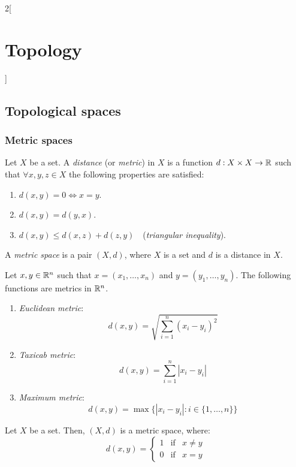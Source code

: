 \documentclass[../../../main.tex]{subfiles}
\begin{document}
\begin{multicols}{2}[\section{Topology}]
  \subsection{Topological spaces}
  \subsubsection{Metric spaces}
  \begin{definition}
    Let $X$ be a set. A \emph{distance} (or \emph{metric}) in $X$ is a function $d:X\times X\rightarrow\mathbb{R} $ such that $\forall x,y,z\in X$ the following properties are satisfied:
    \begin{enumerate}
      \item $d(x,y)=0\iff x=y$.
      \item $d(x,y)=d(y,x)$.
      \item $d(x,y)\leq d(x,z)+d(z,y)\quad$(\emph{triangular inequality}).
    \end{enumerate}
  \end{definition}
  \begin{definition}
    A \emph{metric space} is a pair $(X,d)$, where $X$ is a set and $d$ is a distance in $X$.
  \end{definition}
  \begin{proposition}
    Let $x,y\in\mathbb{R}^n$ such that $x=(x_1,\ldots,x_n)$ and $y=(y_1,\ldots,y_n)$. The following functions are metrics in $\mathbb{R}^n$.
    \begin{enumerate}
      \item \emph{Euclidean metric}: $$d(x,y)=\sqrt{\sum_{i=1}^n{(x_i-y_i)}^2}$$
      \item \emph{Taxicab metric}: $$d(x,y)=\sum_{i=1}^n|x_i-y_i|$$
      \item \emph{Maximum metric}: $$d(x,y)=\max\{|x_i-y_i|:i\in\{1,\ldots,n\}\}$$
    \end{enumerate}
  \end{proposition}
  \begin{proposition}
    Let $X$ be a set. Then, $(X,d)$ is a metric space, where: $$d(x,y)=
      \left\{\begin{array}{lcc}
        1 & \text{if} & x\ne y \\
        0 & \text{if} & x= y
      \end{array}\right.
$$
\end{proposition}
\end{multicols}
\end{document}
